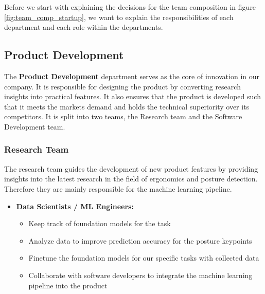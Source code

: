 \p
Before we start with explaining the decisions for the team composition in figure \ref{fig:team_comp_startup}, we want to explain the responsibilities of each department and each role within the departments.

\subsection{Product Development}
The \textbf{Product Development} department serves as the core of innovation in our company.
It is responsible for designing the product by converting research insights into practical features.
It also ensures that the product is developed such that it meets the markets demand and holds the technical superiority over its competitors.
It is split into two teams, the Research team and the Software Development team.

\subsubsection*{Research Team}
The research team guides the development of new product features by providing insights into the latest research in the field of ergonomics and posture detection.
Therefore they are mainly responsible for the machine learning pipeline.
\begin{itemize}
    \item \textbf{Data Scientists / ML Engineers:}
            \begin{itemize}
                \item Keep track of foundation models for the task
                \item Analyze data to improve prediction accuracy for the posture keypoints
                \item Finetune the foundation models for our specific tasks with collected data
                \item Collaborate with software developers to integrate the machine learning pipeline into the product
            \end{itemize}
\end{itemize}

